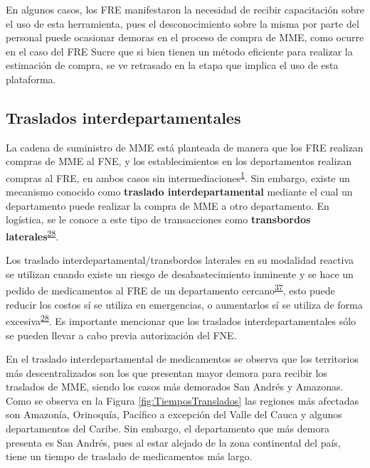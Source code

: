 \documentclass[
]{book}
\begin{document}
En algunos casos, los FRE manifestaron la necesidad de recibir capacitación sobre el uso de esta herramienta, pues el desconocimiento sobre la misma por parte del personal puede ocasionar demoras en el proceso de compra de MME, como ocurre en el caso del FRE Sucre que si bien tienen un método eficiente para realizar la estimación de compra, se ve retrasado en la etapa que implica el uso de esta plataforma.

\hypertarget{traslados-interdepartamentales}{%
\subsection{Traslados interdepartamentales}\label{traslados-interdepartamentales}}

La cadena de suministro de MME está planteada de manera que los FRE realizan compras de MME al FNE, y los establecimientos en los departamentos realizan compras al FRE, en ambos casos sin intermediaciones\textsuperscript{\protect\hyperlink{ref-MSPS1478-2006}{1}}. Sin embargo, existe un mecanismo conocido como \textbf{traslado interdepartamental} mediante el cual un departamento puede realizar la compra de MME a otro departamento. En logística, se le conoce a este tipo de transacciones como \textbf{transbordos laterales}\textsuperscript{\protect\hyperlink{ref-Silver2017}{28}}.

Los traslado interdepartamental/transbordos laterales en su modalidad reactiva se utilizan cuando existe un riesgo de desabastecimiento inminente y se hace un pedido de medicamentos al FRE de un departamento cercano\textsuperscript{\protect\hyperlink{ref-Paterson2011}{37}}, esto puede reducir los costos sí se utiliza en emergencias, o aumentarlos sí se utiliza de forma excesiva\textsuperscript{\protect\hyperlink{ref-Silver2017}{28}}. Es importante mencionar que los traslados interdepartamentales sólo se pueden llevar a cabo previa autorización del FNE.

En el traslado interdepartamental de medicamentos se observa que los territorios más descentralizados son los que presentan mayor demora para recibir los traslados de MME, siendo los casos más demorados San Andrés y Amazonas. Como se observa en la Figura \ref{fig:TiemposTranslados} las regiones más afectadas son Amazonía, Orinoquía, Pacífico a excepción del Valle del Cauca y algunos departamentos del Caribe. Sin embargo, el departamento que más demora presenta es San Andrés, pues al estar alejado de la zona continental del país, tiene un tiempo de traslado de medicamentos más largo.
\end{document}
